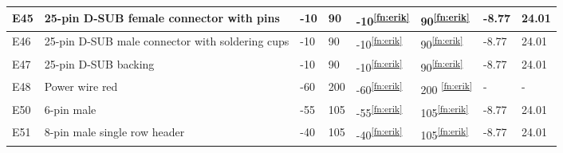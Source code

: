 \begin{longtable}{|m{1cm}|m{3.5cm}|m{1.3cm}|m{1.3cm}|m{1.4cm}|m{1.3cm}|m{1.3cm}|m{1.3cm}|}
E45 & 25-pin D-SUB female connector with pins & -10 & 90 & -10\textsuperscript{\ref{fn:erik}} & 90\textsuperscript{\ref{fn:erik}} & -8.77 & 24.01 \\ \hline
E46 & 25-pin D-SUB male connector with soldering cups & -10 & 90 & -10\textsuperscript{\ref{fn:erik}} & 90\textsuperscript{\ref{fn:erik}} & -8.77 & 24.01 \\ \hline
E47 & 25-pin D-SUB backing & -10 & 90 & -10\textsuperscript{\ref{fn:erik}} & 90\textsuperscript{\ref{fn:erik}} & -8.77 & 24.01 \\ \hline
E48 & Power wire red & -60 & 200 & -60\textsuperscript{\ref{fn:erik}} & 200
\textsuperscript{\ref{fn:erik}} & - & -  \\ \hline
E50 & 6-pin male & -55 & 105 & -55\textsuperscript{\ref{fn:erik}} & 105\textsuperscript{\ref{fn:erik}} & -8.77 & 24.01  \\ \hline
E51 & 8-pin male single row header& -40 & 105 & -40\textsuperscript{\ref{fn:erik}} & 105\textsuperscript{\ref{fn:erik}} & -8.77 & 24.01  \\ \hline

\end{longtable}
